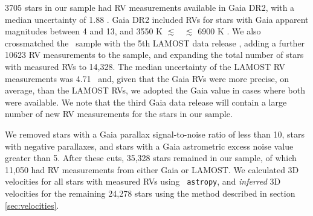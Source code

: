 3705 stars in our sample had RV measurements available in Gaia DR2, with a
median uncertainty of 1.88 \kms.
Gaia DR2 included RVs for stars with Gaia apparent magnitudes between 4
and 13, and 3550 K $\lesssim$ \teff\ $\lesssim$ 6900 K \citep{brown2018}.
We also crossmatched the \mct\ sample with the 5th LAMOST data release
\citep{cui2012, xiang2019}, adding a further 10623 RV measurements to the
sample, and expanding the total number of stars with measured RVs to 14,328.
The median uncertainty of the LAMOST RV measurements was 4.71 \kms\ and,
given that the Gaia RVs were more precise, on average, than the LAMOST
RVs, we adopted the Gaia value in cases where both were available.
We note that the third Gaia data release will contain a large number of new
RV measurements for the stars in our sample.

We removed stars with a Gaia parallax signal-to-noise ratio of less than 10,
stars with negative parallaxes, and stars with a Gaia astrometric excess noise
value greater than 5.
After these cuts, 35,328 stars remained in our sample, of which 11,050 had RV
measurements from either Gaia or LAMOST.
We calculated 3D velocities for all stars with measured RVs using {\tt
astropy}, and {\it inferred} 3D velocities for the remaining 24,278 stars
using the method described in section \ref{sec:velocities}.
